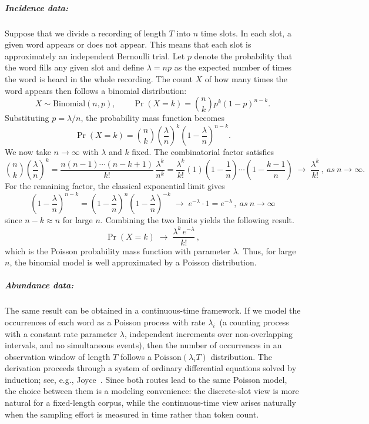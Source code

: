 ﻿\documentclass{article}
\begin{document}
\vspace{1em}
 
\subparagraph{Incidence data:}
Suppose that we divide a recording of length $T$ into $n$ time slots. In each slot, a given word appears or does not appear. This means that each slot is approximately an independent Bernoulli trial. Let $p$ denote the probability that the word fills any given slot and define $\lambda = np$ as the expected number of times the word is heard in the whole recording. The count $X$ of how many times the word appears then follows a binomial distribution:
\[
X \sim \mathrm{Binomial}(n,p), \qquad
\Pr(X=k) = \binom{n}{k}p^k(1-p)^{n-k}.
\]
Substituting $p = \lambda/n$, the probability mass function becomes
\[
\Pr(X=k) = \binom{n}{k}\left(\frac{\lambda}{n}\right)^k\left(1-\frac{\lambda}{n}\right)^{n-k}.
\]
We now take $n \to \infty$ with $\lambda$ and $k$ fixed. The combinatorial factor satisfies
\[
\binom{n}{k}\left(\frac{\lambda}{n}\right)^k
=
\frac{n(n-1)\cdots(n-k+1)}{k!}\,\frac{\lambda^k}{n^k}
=
\frac{\lambda^k}{k!}\left(1\right)\left(1-\frac{1}{n}\right)\cdots\left(1-\frac{k-1}{n}\right)
\;\longrightarrow\; \frac{\lambda^k}{k!}\,,\ as\ n\rightarrow\infty.
\]
For the remaining factor, the classical exponential limit gives
\[
\left(1-\frac{\lambda}{n}\right)^{n-k}
=
\left(1-\frac{\lambda}{n}\right)^{n}
\left(1-\frac{\lambda}{n}\right)^{-k}
\;\longrightarrow\; e^{-\lambda}\cdot 1
=
e^{-\lambda}\,,\ as\ n\rightarrow\infty
\]
since $n - k \approx n$ for large $n$. Combining the two limits yields the following result.
\[
\Pr(X=k)
\;\longrightarrow\;
\frac{\lambda^k\, e^{-\lambda}}{k!}\,,
\]
which is the Poisson probability mass function with parameter $\lambda$. Thus, for large $n$, the binomial model is well approximated by a Poisson distribution.

\subparagraph{Abundance data:}
The same result can be obtained in a continuous-time framework. If we model the occurrences of each word as a Poisson process with rate $\lambda_i$\ (a counting process with a constant rate parameter $\lambda$, independent increments over non-overlapping intervals, and no simultaneous events), then the number of occurrences in an observation window of length $T$ follows a $\mathrm{Poisson}(\lambda_i T)$ distribution. The derivation proceeds through a system of ordinary differential equations solved by induction; see, e.g., Joyce~\cite{joyce2014poisson}. Since both routes lead to the same Poisson model, the choice between them is a modeling convenience: the discrete-slot view is more natural for a fixed-length corpus, while the continuous-time view arises naturally when the sampling effort is measured in time rather than token count.
\end{document}
